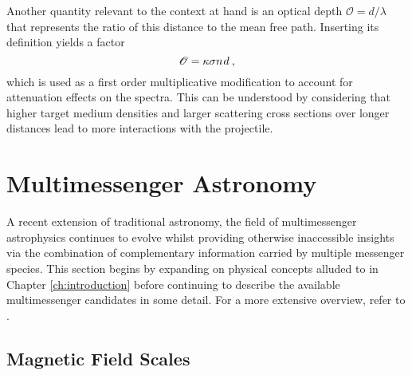 \begin{spacing}{0.985}
	Another quantity relevant to the context at hand is an optical depth $\mathscr{O} = d / \lambda$ that represents the ratio of this
	distance to the mean free path. Inserting its definition yields a factor
	\begin{equation}
		\mathscr{O} = \kappa\sigma n \kern+0.75pt d \: ,
		\label{eqn:optical}
	\end{equation}
	which is used as a first order multiplicative modification to account for attenuation effects on the spectra. This can be understood
	by considering that higher target medium densities and larger scattering cross sections over longer distances lead to more interactions
	with the projectile. 
	
	
	
	\section{Multimessenger Astronomy}
	\label{sec:multimessenger}
	
	A recent extension of traditional astronomy, the field of multimessenger astrophysics continues to evolve whilst providing otherwise
	inaccessible insights via the combination of complementary information carried by multiple messenger species. This section begins by
	expanding on physical concepts alluded to in Chapter \ref{ch:introduction} before continuing to describe the available multimessenger
	candidates in some detail. For a more extensive overview, refer to \cite{Meszaros_2019}.
	
	
	
	\subsection{Magnetic Field Scales}
	\label{sub:fields}
	

\end{spacing}
